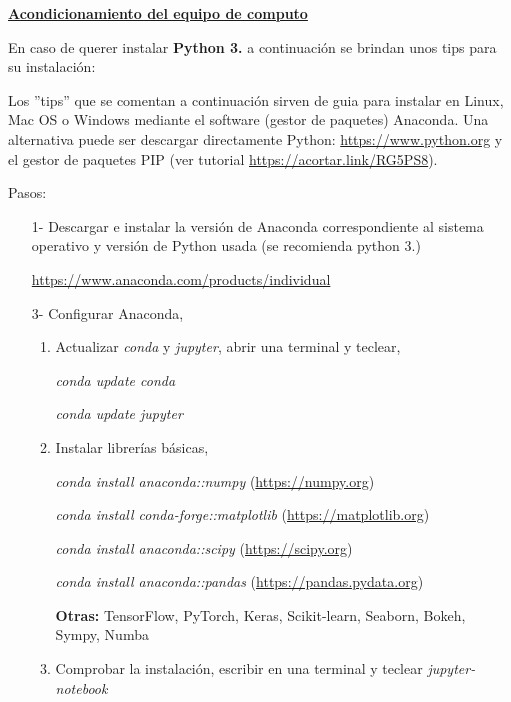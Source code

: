 \documentclass[12pt]{amsart} %
\begin{document}

\vspace*{22pt}

\uline{\large{\textbf{Acondicionamiento del equipo de computo}}}

\vspace*{14pt}

En caso de querer instalar  \textbf{Python 3.} a continuación se brindan unos tips para su instalación:
\vspace{14pt}


\hspace{0.375in} Los ''tips'' que se comentan a continuación sirven de guia para instalar en Linux, Mac OS o Windows mediante el software (gestor de paquetes)  Anaconda. Una alternativa puede ser descargar directamente Python: \url{https://www.python.org} y  el gestor de paquetes PIP (ver tutorial \url{https://acortar.link/RG5PS8}).

\vspace{12pt}

Pasos:
\begin{itemize}
	\item[1-] Descargar e instalar la versión de Anaconda correspondiente al sistema operativo y versión de Python usada (se recomienda python 3.)
	 
	\url{https://www.anaconda.com/products/individual}
	
	\item[3-] Configurar Anaconda,
	
	\begin{enumerate}
		\item Actualizar \textit{conda} y \textit{jupyter}, abrir una terminal y teclear,
			\vspace{8pt}
	
			\emph{conda update conda}
	
			\emph{conda update jupyter}
		\item Instalar librerías básicas,
			\vspace{8pt}
	
			\emph{conda install anaconda::numpy} (\url{https://numpy.org})
	
			\emph{conda install conda-forge::matplotlib} (\url{https://matplotlib.org})
	
			\emph{conda install anaconda::scipy} (\url{https://scipy.org})
	
		\emph{conda install anaconda::pandas} (\url{https://pandas.pydata.org})
	
	\vspace{8pt}
	
	\textbf{Otras:} TensorFlow, PyTorch, Keras, Scikit-learn, Seaborn, Bokeh, Sympy, Numba
	\item Comprobar la instalación, escribir en una terminal y teclear
	\vspace{8pt}
	\emph{jupyter-notebook}
		\end{enumerate}
\end{itemize}
\end{document}
